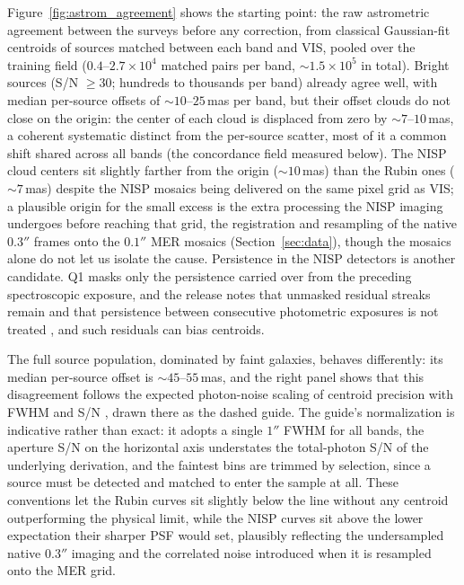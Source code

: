 \documentclass[twocolumn,linenumbers]{aastex701}
\begin{document}
Figure~\ref{fig:astrom_agreement} shows the starting point: the raw astrometric agreement between the surveys before any correction, from classical Gaussian-fit centroids of sources matched between each band and VIS, pooled over the training field ($0.4$--$2.7\times10^{4}$ matched pairs per band, ${\sim}1.5\times10^{5}$ in total). Bright sources (S/N $\geq 30$; hundreds to thousands per band) already agree well, with median per-source offsets of ${\sim}10$--$25$\,mas per band, but their offset clouds do not close on the origin: the center of each cloud is displaced from zero by ${\sim}7$--$10$\,mas, a coherent systematic distinct from the per-source scatter, most of it a common shift shared across all bands (the concordance field measured below). The NISP cloud centers sit slightly farther from the origin (${\sim}10$\,mas) than the Rubin ones (${\sim}7$\,mas) despite the NISP mosaics being delivered on the same pixel grid as VIS; a plausible origin for the small excess is the extra processing the NISP imaging undergoes before reaching that grid, the registration and resampling of the native $0.3''$ frames onto the $0.1''$ MER mosaics (Section~\ref{sec:data}), though the mosaics alone do not let us isolate the cause. Persistence in the NISP detectors is another candidate. Q1 masks only the persistence carried over from the preceding spectroscopic exposure, and the release notes that unmasked residual streaks remain and that persistence between consecutive photometric exposures is not treated \citep{NIR}, and such residuals can bias centroids.

The full source population, dominated by faint galaxies, behaves differently: its median per-source offset is ${\sim}45$--$55$\,mas, and the right panel shows that this disagreement follows the expected photon-noise scaling of centroid precision with FWHM and S/N \citep{king1983}, drawn there as the dashed guide. The guide's normalization is indicative rather than exact: it adopts a single $1''$ FWHM for all bands, the aperture S/N on the horizontal axis understates the total-photon S/N of the underlying derivation, and the faintest bins are trimmed by selection, since a source must be detected and matched to enter the sample at all. These conventions let the Rubin curves sit slightly below the line without any centroid outperforming the physical limit, while the NISP curves sit above the lower expectation their sharper PSF would set, plausibly reflecting the undersampled native $0.3''$ imaging and the correlated noise introduced when it is resampled onto the MER grid.
\end{document}
